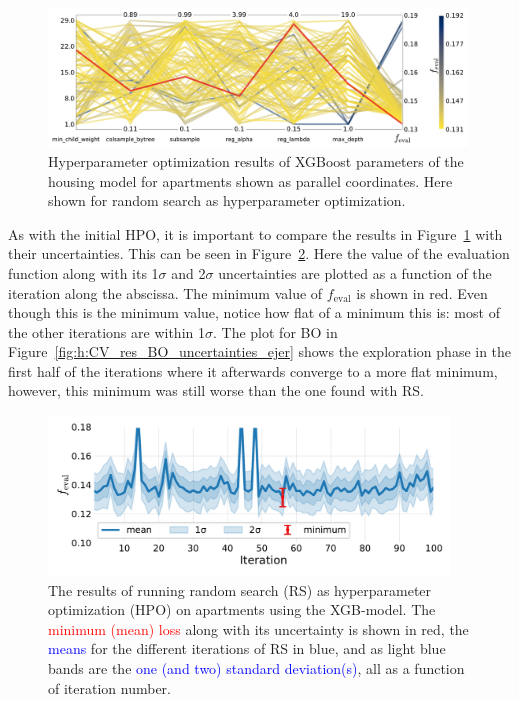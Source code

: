 \begin{figure}
  \centerfloat
  \includegraphics[width=0.99\textwidth, trim=0 0 0 0, clip]{figures/housing/Ejerlejlighed_v19_cut_all_Ncols_all_CV_viz_HPO_RS.pdf}
  \caption[XXX]
          {Hyperparameter optimization results of XGBoost parameters of the housing model for apartments shown as parallel coordinates. Here shown for random search as hyperparameter optimization.
          } 
  \label{fig:h:CV_res_RS_parallel_coords_ejer}
\end{figure}

As with the initial HPO, it is important to compare the results in Figure~\ref{fig:h:CV_res_RS_parallel_coords_ejer} with their uncertainties. This can be seen in Figure~\ref{fig:h:CV_res_RS_uncertainties_ejer}. Here the value of the evaluation function along with its \num{1}$\sigma$  and \num{2}$\sigma$ uncertainties are plotted as a function of the iteration along the abscissa. The minimum value of $f_\mathrm{eval}$ is shown in red. Even though this is the minimum value, notice how flat of a minimum this is: most of the other iterations are within \num{1}$\sigma$. The plot for BO in Figure~\ref{fig:h:CV_res_BO_uncertainties_ejer} shows the exploration phase in the first half of the iterations where it afterwards converge to a more flat minimum, however, this minimum was still worse than the one found with RS. 

\begin{figure}
  \centerfloat
  \includegraphics[width=0.95\textwidth, trim=0 0 0 0, clip]{figures/housing/Ejerlejlighed_v19_cut_all_Ncols_all_xgb_score_over_time_random.pdf}
  \caption[Hyperparameter optimization: random search results]
          {The results of running random search (RS) as hyperparameter optimization (HPO) on apartments using the XGB-model. The \textcolor{red}{minimum (mean) loss} along with its uncertainty is shown in red, the \textcolor{blue}{means} for the different iterations of RS in blue, and as light blue bands are the \textcolor{blue}{one (and two) standard deviation(s)}, all as a function of iteration number.} 
  \label{fig:h:CV_res_RS_uncertainties_ejer}
\end{figure}

